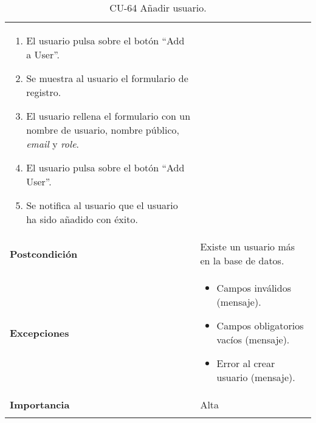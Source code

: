 \begin{longtable}[]{@{}ll@{}}
\begin{minipage}[t]{0.74\columnwidth}
\begin{enumerate}
\tightlist
\item
  El usuario pulsa sobre el botón ``Add a User''.
\item
  Se muestra al usuario el formulario de registro.
\item
  El usuario rellena el formulario con un nombre de usuario, nombre
  público, \emph{email} y \emph{role}.
\item
  El usuario pulsa sobre el botón ``Add User''.
\item
  Se notifica al usuario que el usuario ha sido añadido con éxito.
\end{enumerate}\strut
\end{minipage}\tabularnewline
\begin{minipage}[t]{0.20\columnwidth}\raggedright
\textbf{Postcondición}\strut
\end{minipage} & \begin{minipage}[t]{0.74\columnwidth}\raggedright
Existe un usuario más en la base de datos.\strut
\end{minipage}\tabularnewline
\begin{minipage}[t]{0.20\columnwidth}\raggedright
\textbf{Excepciones}\strut
\end{minipage} & \begin{minipage}[t]{0.74\columnwidth}\raggedright
\begin{itemize}
\tightlist
\item
  Campos inválidos (mensaje).
\item
  Campos obligatorios vacíos (mensaje).
\item
  Error al crear usuario (mensaje).
\end{itemize}\strut
\end{minipage}\tabularnewline
\begin{minipage}[t]{0.20\columnwidth}\raggedright
\textbf{Importancia}\strut
\end{minipage} & \begin{minipage}[t]{0.74\columnwidth}\raggedright
Alta\strut
\end{minipage}\tabularnewline
\bottomrule
\caption{CU-64 Añadir usuario.}
\end{longtable}

